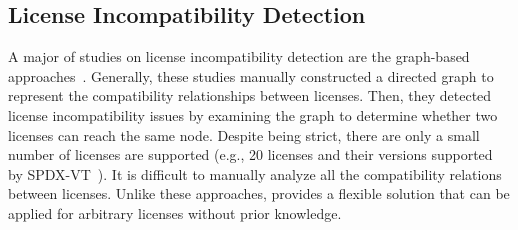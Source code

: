 \subsection{License Incompatibility Detection}
A major of studies on license incompatibility detection are the graph-based approaches~\cite{jss`17-Kapitsaki-SPDX,SRDSCB`14-Kapitsaki-SPDX,Wheeler`07-Wheeler,paschalides2016validate}. 
Generally, these studies manually constructed a directed graph to represent the compatibility relationships between licenses. %
Then, they detected license incompatibility issues by examining the graph to determine whether two licenses can reach the same node. %
Despite being strict, %
there are only a small number of licenses are supported (e.g., 20 licenses and their versions supported by SPDX-VT~\cite{jss`17-Kapitsaki-SPDX}). %
It is difficult to manually analyze all the compatibility relations between licenses. Unlike these approaches, \tool provides a flexible solution that can be applied for arbitrary licenses without prior knowledge. %


